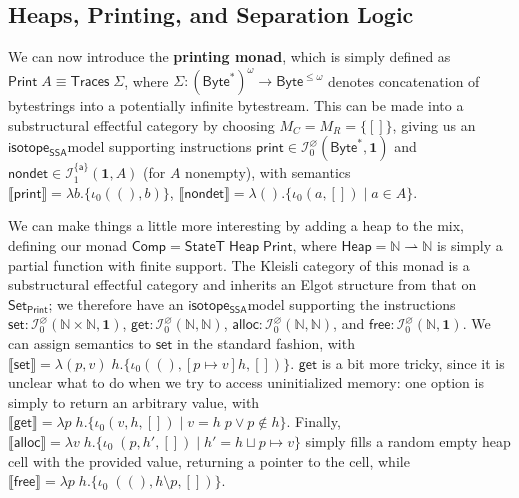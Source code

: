 \documentclass[acmsmall,screen,review]{acmart}
\newcommand{\mc}[1]{\ensuremath{\mathcal{#1}}}
\newcommand{\mb}[1]{\ensuremath{\mathbf{#1}}}
\newcommand{\ms}[1]{\ensuremath{\mathsf{#1}}}
\newcommand{\nats}{\mathbb{N}}
\newcommand{\taff}{{\{\ms{a}\}}}
\newcommand{\dnt}[1]{\llbracket{#1}\rrbracket}
\newcommand{\isotopessa}{\ms{isotope_{SSA}}}
\begin{document}
\subsection{Heaps, Printing, and Separation Logic}

\label{ssec:separation}

We can now introduce the \textbf{printing monad}, which is simply defined as
\(\ms{Print}\;A \equiv \ms{Traces}\;\Sigma\), where \(\Sigma:
(\ms{Byte}^*)^\omega \to \ms{Byte}^{\leq \omega}\) denotes concatenation of
bytestrings into a potentially infinite bytestream. This can be made into a
substructural effectful category by choosing \(M_C = M_R = \{[]\}\), giving us
an \isotopessa model supporting instructions \(\ms{print} \in
\mc{I}^\varnothing_0(\ms{Byte}^*, \mb{1})\) and \(\ms{nondet} \in
\mc{I}^\taff_1(\mb{1}, A)\) (for \(A\) nonempty), with semantics
\(\dnt{\ms{print}} = \lambda b.\{\iota_0 ((), b)\}\), \(\dnt{\ms{nondet}} =
\lambda (). \{\iota_0 (a, []) \mid a \in A\}\).

We can make things a little more interesting by adding a heap to the mix,
defining our monad \(\ms{Comp} = \ms{StateT}\;\ms{Heap}\;\ms{Print}\), where
\(\ms{Heap} = \nats \rightharpoonup \nats\) is simply a partial function with
finite support. The Kleisli category of this monad is a substructural effectful
category and inherits an Elgot structure from that on \(\ms{Set}_{\ms{Print}}\);
we therefore have an \isotopessa model supporting the instructions \(\ms{set}:
\mc{I}^\varnothing_0(\nats \times \nats, \mb{1})\), \(\ms{get}:
\mc{I}^\varnothing_0(\nats, \nats)\), \(\ms{alloc}: \mc{I}^\varnothing_0(\nats,
\nats)\), and \(\ms{free}: \mc{I}^\varnothing_0(\nats, \mb{1})\). We can assign
semantics to \(\ms{set}\) in the standard fashion, with \(\dnt{\ms{set}} =
\lambda (p, v)\;h. \{\iota_0((), [p \mapsto v]h, [])\}\). \(\ms{get}\) is a bit
more tricky, since it is unclear what to do when we try to access uninitialized
memory: one option is simply to return an arbitrary value, with \(\dnt{\ms{get}}
= \lambda p\;h. \{\iota_0(v, h, []) \mid v = h\;p \lor p \notin h\}\). Finally,
\(\dnt{\ms{alloc}} = \lambda v\;h.\{\iota_0\;(p, h', []) \mid h' = h \sqcup p
\mapsto v\}\) simply fills a random empty heap cell with the provided value,
returning a pointer to the cell, while \(\dnt{\ms{free}} = \lambda p\;h.
\{\iota_0\;((), h \setminus p, [])\}\).
\end{document}
